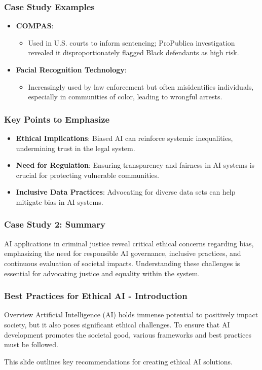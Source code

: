 \documentclass[aspectratio=169]{beamer}
\begin{document}
\begin{frame}[fragile]
  \frametitle{Case Study Examples}
  \begin{itemize}
    \item \textbf{COMPAS}:
      \begin{itemize}
        \item Used in U.S. courts to inform sentencing; ProPublica investigation revealed it disproportionately flagged Black defendants as high risk.
      \end{itemize}
    \item \textbf{Facial Recognition Technology}:
      \begin{itemize}
        \item Increasingly used by law enforcement but often misidentifies individuals, especially in communities of color, leading to wrongful arrests.
      \end{itemize}
  \end{itemize}
\end{frame}

\begin{frame}[fragile]
  \frametitle{Key Points to Emphasize}
  \begin{itemize}
    \item \textbf{Ethical Implications}: Biased AI can reinforce systemic inequalities, undermining trust in the legal system.
    \item \textbf{Need for Regulation}: Ensuring transparency and fairness in AI systems is crucial for protecting vulnerable communities.
    \item \textbf{Inclusive Data Practices}: Advocating for diverse data sets can help mitigate bias in AI systems.
  \end{itemize}
\end{frame}

\begin{frame}[fragile]
  \frametitle{Case Study 2: Summary}
  AI applications in criminal justice reveal critical ethical concerns regarding bias, emphasizing the need for responsible AI governance, inclusive practices, and continuous evaluation of societal impacts. Understanding these challenges is essential for advocating justice and equality within the system.
\end{frame}

\begin{frame}[fragile]
    \frametitle{Best Practices for Ethical AI - Introduction}
    \begin{block}{Overview}
        Artificial Intelligence (AI) holds immense potential to positively impact society, but it also poses significant ethical challenges. 
        To ensure that AI development promotes the societal good, various frameworks and best practices must be followed.
    \end{block}
    This slide outlines key recommendations for creating ethical AI solutions.
\end{frame}
\end{document}
